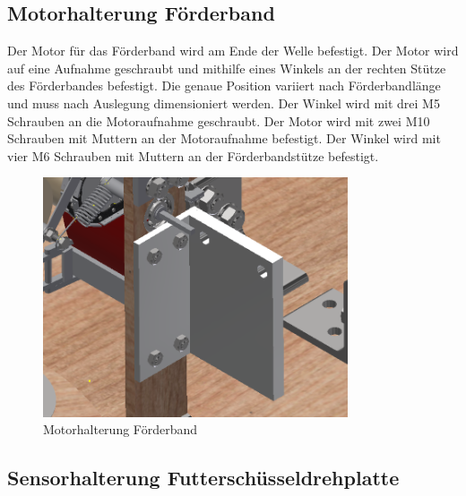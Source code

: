 \subsection{Motorhalterung Förderband}
Der Motor für das Förderband wird am Ende der Welle befestigt. Der Motor wird auf eine Aufnahme geschraubt und mithilfe eines Winkels an der rechten Stütze des Förderbandes befestigt. Die genaue Position variiert nach Förderbandlänge und muss nach Auslegung dimensioniert werden. Der Winkel wird mit drei M5 Schrauben an die Motoraufnahme geschraubt. Der Motor wird mit zwei M10 Schrauben mit Muttern an der Motoraufnahme befestigt. Der Winkel wird mit vier M6 Schrauben mit Muttern an der Förderbandstütze befestigt.
\begin{figure}[H] 
\begin{center}
\includegraphics[width=9cm]{Bilder/Inventor/Motorhalterung_Foerderband}
\caption{Motorhalterung Förderband}
\label{Motor_mount_foerd}
\end{center}
\end{figure}
\subsection{Sensorhalterung Futterschüsseldrehplatte}

